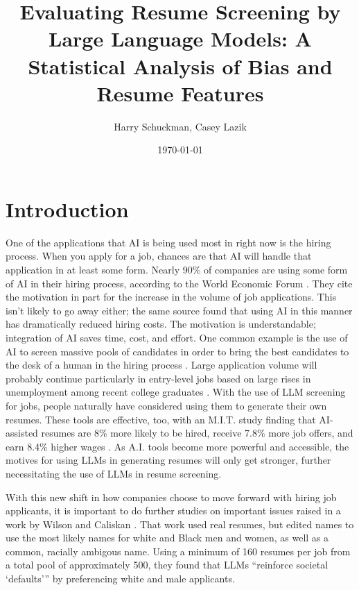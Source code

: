 \documentclass[11pt,letterpaper]{article}
\title{\textbf{Evaluating Resume Screening by Large Language Models: A Statistical Analysis of Bias and Resume Features}}
\author{
Harry Schuckman,
Casey Lazik
}
\date{\today}
\begin{document}
\maketitle


 
 

\section{Introduction}

\par
One of the applications that AI is being used most in right now is the hiring process. When you apply for a job, chances are that AI will handle that application in at least some form. Nearly 90\% of companies are using some form of AI in their hiring process, according to the World Economic Forum \cite{wef}. They cite the motivation in part for the increase in the volume of job applications. This isn’t likely to go away either; the same source found that using AI in this manner has dramatically reduced hiring costs. The motivation is understandable; integration of AI saves time, cost, and effort. One common example is the use of AI to screen massive pools of candidates in order to bring the best candidates to the desk of a human in the hiring process \cite{rfv}. Large application volume will probably continue particularly in entry-level jobs based on large rises in unemployment among recent college graduates \cite{fed_res}. With the use of LLM screening for jobs, people naturally have considered using them to generate their own resumes. These tools are effective, too, with an M.I.T. study finding that AI-assisted resumes are 8\% more likely to be hired, receive 7.8\% more job offers, and earn 8.4\% higher wages \cite{mit}. As A.I. tools become more powerful and accessible, the motives for using LLMs in generating resumes will only get stronger, further necessitating the use of LLMs in resume screening.

With this new shift in how companies choose to move forward with hiring job applicants, it is important to do further studies on important issues raised in a work by Wilson and Caliskan \cite{caliskan}. That work used real resumes, but edited names to use the most likely names for white and Black men and women, as well as a common, racially ambigous name. Using a minimum of 160 resumes per job from a total pool of approximately 500, they found that LLMs “reinforce societal ‘defaults’” by preferencing white and male applicants. 
\end{document}
